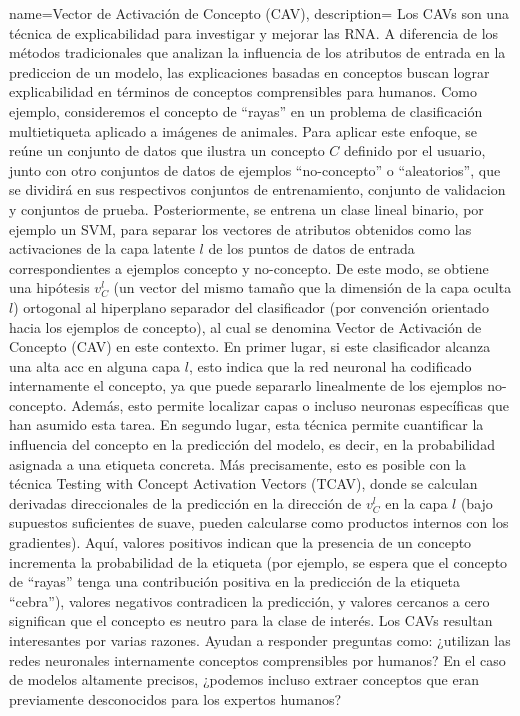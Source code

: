 {name={Vector de Activación de Concepto (CAV)},
	description={ 
Los CAVs \cite{kim2018interpretability} son una técnica de explicabilidad para investigar y mejorar las RNA. A diferencia de los métodos tradicionales que analizan la influencia de los atributos de entrada en la prediccion de un modelo, las explicaciones basadas en conceptos buscan lograr explicabilidad en términos de conceptos comprensibles para humanos.  
Como ejemplo, consideremos el concepto de “rayas” en un problema de clasificación multietiqueta aplicado a imágenes de animales.  
Para aplicar este enfoque, se reúne un conjunto de datos que ilustra un concepto $C$ definido por el usuario, junto con otro conjuntos de datos de ejemplos “no-concepto” o “aleatorios”, que se dividirá en sus respectivos conjuntos de entrenamiento, conjunto de validacion y conjuntos de prueba.  
Posteriormente, se entrena un clase lineal binario, por ejemplo un SVM, para separar los vectores de atributos obtenidos como las activaciones de la capa latente $l$ de los puntos de datos de entrada correspondientes a ejemplos concepto y no-concepto.  
De este modo, se obtiene una hipótesis $v_C^l$ (un vector del mismo tamaño que la dimensión de la capa oculta $l$) ortogonal al hiperplano separador del clasificador (por convención orientado hacia los ejemplos de concepto), al cual se denomina Vector de Activación de Concepto (CAV) en este contexto.  
En primer lugar, si este clasificador alcanza una alta acc en alguna capa $l$, esto indica que la red neuronal ha codificado internamente el concepto, ya que puede separarlo linealmente de los ejemplos no-concepto. Además, esto permite localizar capas o incluso neuronas específicas que han asumido esta tarea.  
En segundo lugar, esta técnica permite cuantificar la influencia del concepto en la predicción del modelo, es decir, en la probabilidad asignada a una etiqueta concreta. Más precisamente, esto es posible con la técnica Testing with Concept Activation Vectors (TCAV), donde se calculan derivadas direccionales de la predicción en la dirección de $v_C^l$ en la capa $l$ (bajo supuestos suficientes de suave, pueden calcularse como productos internos con los gradientes).  
Aquí, valores positivos indican que la presencia de un concepto incrementa la probabilidad de la etiqueta (por ejemplo, se espera que el concepto de “rayas” tenga una contribución positiva en la predicción de la etiqueta “cebra”), valores negativos contradicen la predicción, y valores cercanos a cero significan que el concepto es neutro para la clase de interés.  
Los CAVs resultan interesantes por varias razones. Ayudan a responder preguntas como: ¿utilizan las redes neuronales internamente conceptos comprensibles por humanos? En el caso de modelos altamente precisos, ¿podemos incluso extraer conceptos que eran previamente desconocidos para los expertos humanos?  
}}
